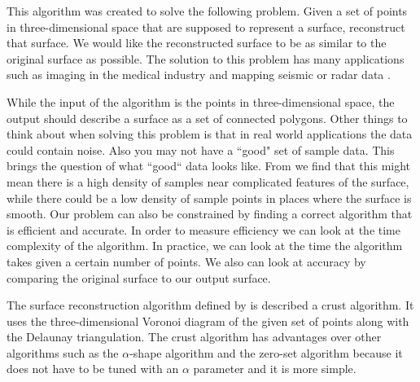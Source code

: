 \documentclass{article}
\begin{document}
This algorithm was created to solve the following problem. Given a set of points in three-dimensional space that are supposed to represent a surface, reconstruct that surface. We would like the reconstructed surface to be as similar to the original surface as possible. The solution to this problem has many applications such as imaging in the medical industry and mapping seismic or radar data \cite{amenta1998new}. 

While the input of the algorithm is the points in three-dimensional space, the output should describe a surface as a set of connected polygons. Other things to think about when solving this problem is that in real world applications the data could contain noise. Also you may not have a ``good" set of sample data. This brings the question of what ``good`` data looks like. From \cite{amenta1998new} we find that this might mean there is a high density of samples near complicated features of the surface, while there could be a low density of sample points in places where the surface is smooth. Our problem can also be constrained by finding a correct algorithm that is efficient and accurate. In order to measure efficiency we can look at the time complexity of the algorithm. In practice, we can look at the time the algorithm takes given a certain number of points. We also can look at accuracy by comparing the original surface to our output surface. 

The surface reconstruction algorithm defined by \cite{amenta1998new} is described a crust algorithm. It uses the three-dimensional Voronoi diagram of the given set of points along with the Delaunay triangulation. The crust algorithm has advantages over other algorithms such as the $\alpha$-shape algorithm and the zero-set algorithm because it does not have to be tuned with an $\alpha$ parameter and it is more simple.

 

\end{document}
